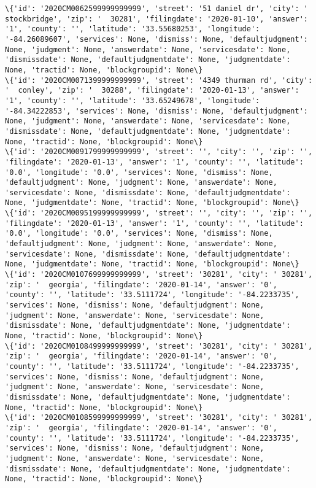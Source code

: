 \documentclass[11pt]{article}
\begin{document}
\begin{Verbatim}[commandchars=\\\{\}]
\{'id': '2020CM0062599999999999', 'street': '51 daniel dr', 'city': '  stockbridge', 'zip': '  30281', 'filingdate': '2020-01-10', 'answer': '1', 'county': '', 'latitude': '33.55680253', 'longitude': '-84.26089607', 'services': None, 'dismiss': None, 'defaultjudgment': None, 'judgment': None, 'answerdate': None, 'servicesdate': None, 'dismissdate': None, 'defaultjudgmentdate': None, 'judgmentdate': None, 'tractid': None, 'blockgroupid': None\}
\{'id': '2020CM0071399999999999', 'street': '4349 thurman rd', 'city': '  conley', 'zip': '  30288', 'filingdate': '2020-01-13', 'answer': '1', 'county': '', 'latitude': '33.65249678', 'longitude': '-84.34222853', 'services': None, 'dismiss': None, 'defaultjudgment': None, 'judgment': None, 'answerdate': None, 'servicesdate': None, 'dismissdate': None, 'defaultjudgmentdate': None, 'judgmentdate': None, 'tractid': None, 'blockgroupid': None\}
\{'id': '2020CM0091799999999999', 'street': '', 'city': '', 'zip': '', 'filingdate': '2020-01-13', 'answer': '1', 'county': '', 'latitude': '0.0', 'longitude': '0.0', 'services': None, 'dismiss': None, 'defaultjudgment': None, 'judgment': None, 'answerdate': None, 'servicesdate': None, 'dismissdate': None, 'defaultjudgmentdate': None, 'judgmentdate': None, 'tractid': None, 'blockgroupid': None\}
\{'id': '2020CM0095199999999999', 'street': '', 'city': '', 'zip': '', 'filingdate': '2020-01-13', 'answer': '1', 'county': '', 'latitude': '0.0', 'longitude': '0.0', 'services': None, 'dismiss': None, 'defaultjudgment': None, 'judgment': None, 'answerdate': None, 'servicesdate': None, 'dismissdate': None, 'defaultjudgmentdate': None, 'judgmentdate': None, 'tractid': None, 'blockgroupid': None\}
\{'id': '2020CM0107699999999999', 'street': '30281', 'city': ' 30281', 'zip': '  georgia', 'filingdate': '2020-01-14', 'answer': '0', 'county': '', 'latitude': '33.5111724', 'longitude': '-84.2233735', 'services': None, 'dismiss': None, 'defaultjudgment': None, 'judgment': None, 'answerdate': None, 'servicesdate': None, 'dismissdate': None, 'defaultjudgmentdate': None, 'judgmentdate': None, 'tractid': None, 'blockgroupid': None\}
\{'id': '2020CM0108499999999999', 'street': '30281', 'city': ' 30281', 'zip': '  georgia', 'filingdate': '2020-01-14', 'answer': '0', 'county': '', 'latitude': '33.5111724', 'longitude': '-84.2233735', 'services': None, 'dismiss': None, 'defaultjudgment': None, 'judgment': None, 'answerdate': None, 'servicesdate': None, 'dismissdate': None, 'defaultjudgmentdate': None, 'judgmentdate': None, 'tractid': None, 'blockgroupid': None\}
\{'id': '2020CM0108599999999999', 'street': '30281', 'city': ' 30281', 'zip': '  georgia', 'filingdate': '2020-01-14', 'answer': '0', 'county': '', 'latitude': '33.5111724', 'longitude': '-84.2233735', 'services': None, 'dismiss': None, 'defaultjudgment': None, 'judgment': None, 'answerdate': None, 'servicesdate': None, 'dismissdate': None, 'defaultjudgmentdate': None, 'judgmentdate': None, 'tractid': None, 'blockgroupid': None\}

\end{Verbatim}
\end{document}
